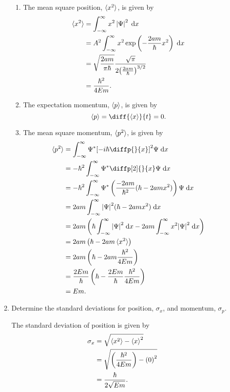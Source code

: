 \documentclass[a4paper, 12pt]{config/homework}
\begin{document}
\begin{enumerate}
\begin{enumerate}[label = (\alph*)]
\begin{enumerate}[label=\roman*.]
\item The mean square position, \(\braket{x^2}\), is given by
\begin{align*}
\braket{x^2} &= \bint{-\infty}{\infty}{x^2 \left|\Psi\right|^2}{x}
\\&= A^2 \bint{-\infty}{\infty}{x^2 \exp\left(- \frac{2am}{\hbar} x^2\right)}{x}
\\&= \sqrt{\frac{2am}{\pi\hbar}} \frac{\sqrt{\pi}}{2 {\left(\frac{2am}{\hbar}\right)}^{3/2} }
\\&= \frac{\hbar^2}{4Em}.
\end{align*}

\item The expectation momentum, \(\braket{p}\), is given by
\[\braket{p} = \diff{\braket{x}}{t} = 0.\]

\item The mean square momentum, \(\braket{p^2}\), is given by
\begin{align*}
\braket{p^2} &= \bint{-\infty}{\infty}{\Psi^* {\left[-i\hbar \diffp{}{x}\right]}^2 \Psi}{x}
\\&= -\hbar^2 \bint{-\infty}{\infty}{\Psi^* \diffp[2]{}{x}\Psi}{x}
\\&= -\hbar^2 \bint{-\infty}{\infty}{\Psi^* \left(\frac{-2am}{\hbar^2}(\hbar - 2amx^2)\right) \Psi}{x}
\\&= 2am \bint{-\infty}{\infty}{{\left|\Psi\right|}^2 (\hbar - 2amx^2)}{x}
\\&= 2am \left(\hbar\bint{-\infty}{\infty}{{\left|\Psi\right|}^2}{x} - 2am\bint{-\infty}{\infty}{x^2 {\left|\Psi\right|}^2}{x}\right)
\\&= 2am \left(\hbar - 2am \braket{x^2}\right)
\\&= 2am \left(\hbar - 2am \frac{\hbar^2}{4Em}\right)
\\&= \frac{2Em}{\hbar} \left(\hbar - \frac{2Em}{\hbar}\frac{\hbar^2}{4Em}\right)
\\&= Em.
\end{align*}
\end{enumerate}

\item Determine the standard deviations for position, \(\sigma_x\), and momentum, \(\sigma_p\).

The standard deviation of position is given by
\begin{align*}
\sigma_x &= \sqrt{\braket{x^2} - \braket{x}^2}
\\&= \sqrt{\left(\frac{\hbar^2}{4Em}\right) - {\left(0\right)}^2}
\\&= \frac{\hbar}{2 \sqrt{Em}}.
\end{align*}


\end{enumerate}
\end{enumerate}
\end{document}
